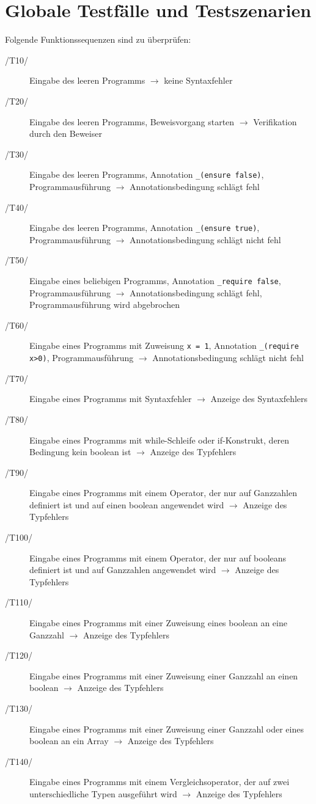 \documentclass[a4paper,10pt]{article}
\begin{document}
\section{Globale Testfälle und Testszenarien}
Folgende Funktionssequenzen sind zu überprüfen:
\begin{description}
\item[/T10/] Eingabe des leeren Programms $\to$ keine Syntaxfehler
\item[/T20/] Eingabe des leeren Programms, Beweisvorgang starten $\to$ Verifikation durch den Beweiser
\item[/T30/] Eingabe des leeren Programms, Annotation \texttt{\_(ensure false)}, Programmausführung $\to$ Annotationsbedingung schlägt fehl
\item[/T40/] Eingabe des leeren Programms, Annotation \texttt{\_(ensure true)}, Programmausführung $\to$ Annotationsbedingung schlägt nicht fehl
\item[/T50/] Eingabe eines beliebigen Programms, Annotation \texttt{\_require false}, Programmausführung $\to$ Annotationsbedingung schlägt fehl, Programmausführung wird abgebrochen
\item[/T60/] Eingabe eines Programms mit Zuweisung \texttt{x = 1}, Annotation \texttt{\_(require x>0)}, Programmausführung $\to$ Annotationsbedingung schlägt nicht fehl
\item[/T70/] Eingabe eines Programms mit Syntaxfehler $\to$ Anzeige des Syntaxfehlers
\item[/T80/] Eingabe eines Programms mit while-Schleife oder if-Konstrukt, deren Bedingung kein boolean ist $\to$ Anzeige des Typfehlers
\item[/T90/] Eingabe eines Programms mit einem Operator, der nur auf Ganzzahlen definiert ist und auf einen boolean angewendet wird $\to$ Anzeige des Typfehlers
\item[/T100/] Eingabe eines Programms mit einem Operator, der nur auf booleans definiert ist und auf Ganzzahlen angewendet wird $\to$ Anzeige des Typfehlers
\item[/T110/] Eingabe eines Programms mit einer Zuweisung eines boolean an eine Ganzzahl $\to$ Anzeige des Typfehlers
\item[/T120/] Eingabe eines Programms mit einer Zuweisung einer Ganzzahl an einen boolean $\to$ Anzeige des Typfehlers
\item[/T130/] Eingabe eines Programms mit einer Zuweisung einer Ganzzahl oder eines boolean an ein Array $\to$ Anzeige des Typfehlers
\item[/T140/] Eingabe eines Programms mit einem Vergleichsoperator, der auf zwei unterschiedliche Typen ausgeführt wird $\to$ Anzeige des Typfehlers

\end{description}
\end{document}
